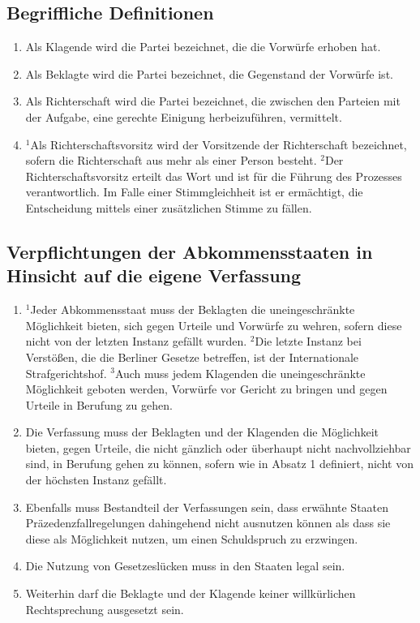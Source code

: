 \documentclass{article}
\begin{document}
\subsection{Begriffliche Definitionen}
\begin{enumerate}[(1)]
    \item Als Klagende wird die Partei bezeichnet, die die Vorwürfe erhoben hat.
    \item Als Beklagte wird die Partei bezeichnet, die Gegenstand der Vorwürfe ist.
    \item Als Richterschaft wird die Partei bezeichnet, die zwischen den Parteien mit der Aufgabe, eine gerechte Einigung herbeizuführen, vermittelt.
    \item ${^1}$Als Richterschaftsvorsitz wird der Vorsitzende der Richterschaft bezeichnet, sofern die Richterschaft aus mehr als einer Person besteht. ${^2}$Der Richterschaftsvorsitz erteilt das Wort und ist für die Führung des Prozesses verantwortlich. Im Falle einer Stimmgleichheit ist er ermächtigt, die Entscheidung mittels einer zusätzlichen Stimme zu fällen.
\end{enumerate}

\subsection{Verpflichtungen der Abkommensstaaten in Hinsicht auf die eigene Verfassung}
\begin{enumerate}[(1)]
    \item ${^1}$Jeder Abkommensstaat muss der Beklagten die uneingeschränkte Möglichkeit bieten, sich gegen Urteile und Vorwürfe zu wehren, sofern diese nicht von der letzten Instanz gefällt wurden. ${^2}$Die letzte Instanz bei Verstößen, die die Berliner Gesetze betreffen, ist der Internationale Strafgerichtshof. ${^3}$Auch muss jedem Klagenden die uneingeschränkte Möglichkeit geboten werden, Vorwürfe vor Gericht zu bringen und gegen Urteile in Berufung zu gehen.
    \item Die Verfassung muss der Beklagten und der Klagenden die Möglichkeit bieten, gegen Urteile, die nicht gänzlich oder überhaupt nicht nachvollziehbar sind, in Berufung gehen zu können, sofern wie in Absatz 1 definiert, nicht von der höchsten Instanz gefällt.
    \item Ebenfalls muss Bestandteil der Verfassungen sein, dass erwähnte Staaten Präzedenzfallregelungen dahingehend nicht ausnutzen können als dass sie diese als Möglichkeit nutzen, um einen Schuldspruch zu erzwingen.
    \item Die Nutzung von Gesetzeslücken muss in den Staaten legal sein.
    \item Weiterhin darf die Beklagte und der Klagende keiner willkürlichen Rechtsprechung ausgesetzt sein.
\end{enumerate}
\end{document}
